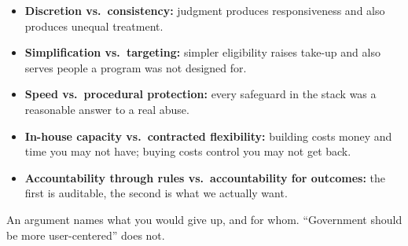 \documentclass[11pt]{article}     %
\begin{document}
\begin{itemize}
    \item \textbf{Discretion vs.\ consistency:} judgment produces responsiveness and also produces unequal treatment.
    \item \textbf{Simplification vs.\ targeting:} simpler eligibility raises take-up and also serves people a program was not designed for.
    \item \textbf{Speed vs.\ procedural protection:} every safeguard in the stack was a reasonable answer to a real abuse.
    \item \textbf{In-house capacity vs.\ contracted flexibility:} building costs money and time you may not have; buying costs control you may not get back.
    \item \textbf{Accountability through rules vs.\ accountability for outcomes:} the first is auditable, the second is what we actually want.
\end{itemize}

\noindent An argument names what you would give up, and for whom. ``Government should be more user-centered'' does not.
\end{document}
